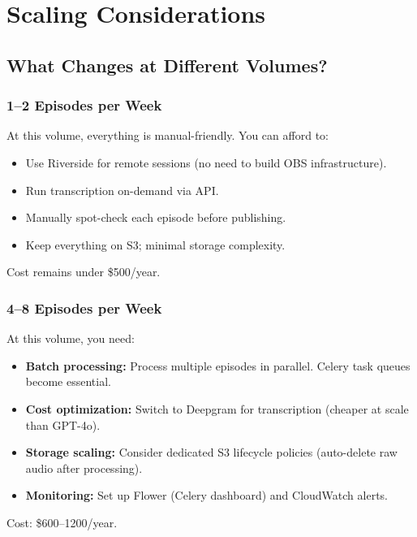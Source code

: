 \documentclass[11pt,letterpaper]{article}
\begin{document}
\vspace{12pt}

\section{Scaling Considerations}

\subsection{What Changes at Different Volumes?}

\subsubsection{1–2 Episodes per Week}

At this volume, everything is manual-friendly. You can afford to:

\begin{itemize}
  \item Use Riverside for remote sessions (no need to build OBS infrastructure).
  \item Run transcription on-demand via API.
  \item Manually spot-check each episode before publishing.
  \item Keep everything on S3; minimal storage complexity.
\end{itemize}

Cost remains under \$500/year.

\subsubsection{4–8 Episodes per Week}

At this volume, you need:

\begin{itemize}
  \item \textbf{Batch processing:} Process multiple episodes in parallel. Celery task queues become essential.
  \item \textbf{Cost optimization:} Switch to Deepgram for transcription (cheaper at scale than GPT-4o).
  \item \textbf{Storage scaling:} Consider dedicated S3 lifecycle policies (auto-delete raw audio after processing).
  \item \textbf{Monitoring:} Set up Flower (Celery dashboard) and CloudWatch alerts.
\end{itemize}

Cost: \$600–1200/year.
\end{document}

